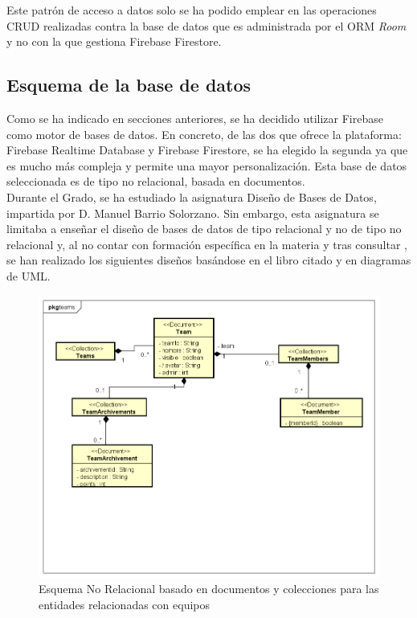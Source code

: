 \documentclass[twoside]{report}
\begin{document}
Este patrón de acceso a datos solo se ha podido emplear en las operaciones CRUD realizadas contra la base de datos que es administrada por el ORM \textit{Room} y no con la que gestiona Firebase Firestore.


\subsection{Esquema de la base de datos}
Como se ha indicado en secciones anteriores, se ha decidido utilizar Firebase como motor de bases de datos. En concreto, de las dos que ofrece la plataforma: Firebase Realtime Database y Firebase Firestore, se ha elegido la segunda ya que es mucho más compleja y permite una mayor personalización. Esta base de datos seleccionada es de tipo no relacional, basada en documentos. \\

Durante el Grado, se ha estudiado la asignatura Diseño de Bases de Datos, impartida por D. Manuel Barrio Solorzano. Sin embargo, esta asignatura se limitaba a enseñar el diseño de bases de datos de tipo relacional y no de tipo no relacional y, al no contar con formación específica en la materia y tras consultar \cite{databasedesign}, se han realizado los siguientes diseños basándose en el libro citado y en diagramas de UML.

\begin{figure}[H]
\centering
\includegraphics[scale=0.5]{images/databaseNRteams}
\caption{Esquema No Relacional basado en documentos y colecciones para las entidades relacionadas con equipos}
\end{figure}
\end{document}
